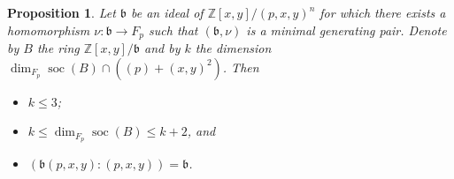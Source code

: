 \documentclass[11pt]{article}
\DeclareMathOperator{\soc}{soc}
\newtheorem{proposition}[corollary]{Proposition}
\theoremstyle{definition}
\begin{document}
\begin{proposition}\label{IdealsInMinimalPairs}
Let $\mathfrak{b}$ be an ideal of $\mathbb{Z}[x,y]/(p,x,y)^n$ for which there exists a homomorphism $\nu:\mathfrak{b}\to F_p$ such that $\left(\mathfrak{b},\nu\right)$ is a minimal generating pair. Denote by $B$ the ring $\mathbb{Z}[x,y]/\mathfrak{b}$ and by $k$ the dimension $\dim_{F_p}\soc(B)\cap\left((p)+(x,y)^2\right)$. Then
\begin{itemize}[topsep=0pt]
\item[(i)] $k\leq 3$;
\item[(ii)] $k\leq \dim_{F_p}\soc(B)\leq k+2$, and
\item[(iii)] $\left(\mathfrak{b}(p,x,y):(p,x,y)\right)=\mathfrak{b}$.
\end{itemize}
\end{proposition}
\end{document}
